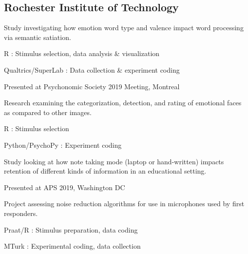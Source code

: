 \documentclass[letterpaper]{deedy-resume} %
\begin{document}
\subsection{Rochester Institute of Technology}
\begin{tightitemize}
\item Study investigating how emotion word type and valence impact word processing via semantic satiation.
\item R : Stimulus selection, data analysis \& visualization
\item Qualtrics/SuperLab : Data collection \& experiment coding
\item Presented at Psychonomic Society 2019 Meeting, Montreal
\end{tightitemize}
\sectionspace %
\pagebreak
\begin{tightitemize}
\item Research examining the categorization, detection, and rating of emotional faces as compared to other images.
\item R : Stimulus selection
\item Python/PsychoPy : Experiment coding
\end{tightitemize}
\sectionspace %
\begin{tightitemize}
\item Study looking at how note taking mode (laptop or hand-written) impacts retention of different kinds of information in an educational setting.
\item Presented at APS 2019, Washington DC
\end{tightitemize}
\sectionspace %
\begin{tightitemize}
\item Project assessing noise reduction algorithms for use in microphones used by first responders.
\item Praat/R : Stimulus preparation, data coding
\item MTurk : Experimental coding, data collection
\end{tightitemize}
\sectionspace %
\end{document}
